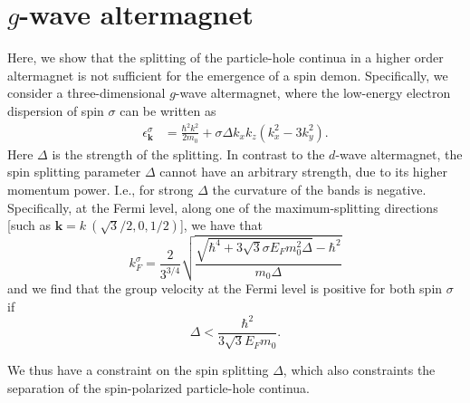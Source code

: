 \documentclass[aps,prb,reprint,twocolumns,superscriptaddress,nofootinbib]{revtex4-2}
\newcommand{\kF}{k_{F}}
\begin{document}
	
	
	\section{$g$-wave altermagnet}
	Here, we show that the splitting of the particle-hole continua in a higher order altermagnet is not sufficient for the emergence of a spin demon. Specifically, we consider a three-dimensional $g$-wave altermagnet, where the low-energy electron dispersion of spin $\sigma$ can be written as \cite{smejkalConventionalFerromagnetismAntiferromagnetism2022}
	\begin{align}
		\epsilon_{\bm k}^\sigma &= \frac{\hbar^2 k^2}{2m_0} + \sigma \Delta  k_xk_z\left(k_x^2-3k_y^2\right).
	\end{align}
	Here $\Delta$ is the strength of the splitting. In contrast to the $d$-wave altermagnet, the spin splitting parameter $\Delta$ cannot have an arbitrary strength, due to its higher momentum power. I.e., for strong $\Delta$ the curvature of the bands is negative. Specifically, at the Fermi level, along one of the maximum-splitting directions [such as $\bm k = k\  (\sqrt{3}/2,0,1/2)$], we have that 
	\begin{equation}
		\kF^\sigma = \frac{2}{3^{3/4}} \sqrt{\frac{\sqrt{\hbar^4+ 3\sqrt{3}\sigma E_Fm_0^2 \Delta  }-\hbar^2}{m_0 \Delta} } \label{eq:kF-g-wave}
	\end{equation}
	and we find that the group velocity at the Fermi level is positive for both spin $\sigma$ if
	\begin{equation}
		\Delta < \frac{\hbar^2}{3\sqrt{3}E_F m_0 }. \label{eq:delta-condition}
	\end{equation}
	
	We thus have a constraint on the spin splitting $\Delta$, which also constraints the separation of the spin-polarized particle-hole continua.  
	
	
	
\end{document}
